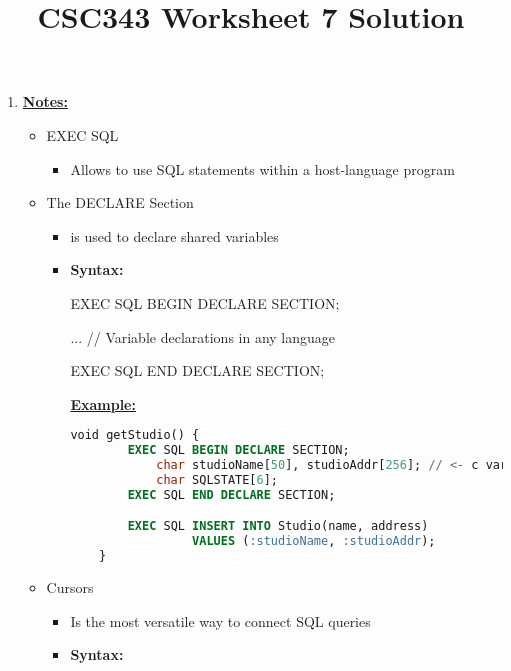 \documentclass[12pt]{article}
\begin{document}
\title{CSC343 Worksheet 7 Solution}
\maketitle

\bigskip

\begin{enumerate}[1.]
    \item

    \bigskip

    \underline{\textbf{Notes:}}

    \bigskip

    \begin{itemize}
        \item EXEC SQL
        \begin{itemize}
            \item Allows to use SQL statements within a host-language program
        \end{itemize}
        \item The DECLARE Section
        \begin{itemize}
            \item is used to declare shared variables
            \item \textbf{Syntax:}

            EXEC SQL BEGIN DECLARE SECTION;

            ... // Variable declarations in any language

            EXEC SQL END DECLARE SECTION;

            \bigskip

            \underline{\textbf{Example:}}

            \bigskip

    \begin{lstlisting}[language=SQL]
    void getStudio() {
        EXEC SQL BEGIN DECLARE SECTION;
            char studioName[50], studioAddr[256]; // <- c variables
            char SQLSTATE[6];
        EXEC SQL END DECLARE SECTION;

        EXEC SQL INSERT INTO Studio(name, address)
                 VALUES (:studioName, :studioAddr);
    }
    \end{lstlisting}
        \end{itemize}

        \item Cursors
        \begin{itemize}
            \item Is the most versatile way to connect SQL queries
            \item \textbf{Syntax:}


\end{itemize}
\end{itemize}
\end{enumerate}
\end{document}
